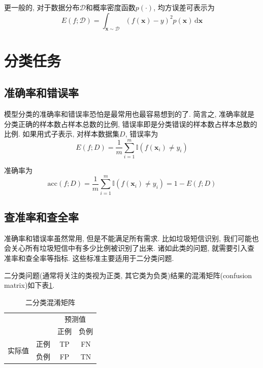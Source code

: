 \documentclass[a4paper,UTF8]{ctexart}
\theoremstyle{plain} \newtheorem{theorem}{定理}[section]
\theoremstyle{plain} \newtheorem{definition}{定义}[section]
\theoremstyle{plain} \newtheorem{lemma}{引理}[section]
\theoremstyle{plain} \newtheorem{proposition}{命题}[section]
\theoremstyle{plain} \newtheorem{example}{例}[section]
\theoremstyle{plain} \newtheorem{remark}{注}[section]
\theoremstyle{plain} \newtheorem{corollary}{推论}[section]
\newcommand\diff{\,{\mathrm d}} %
\begin{document}
更一般的, 对于数据分布$\mathcal{D}$和概率密度函数$p(\cdot)$, 均方误差可表示为
\begin{equation}
E(f; \mathcal{D}) = \int_{\bm{x} \sim \mathcal{D}} (f(\bm{x}) - y)^2 p(\bm{x}) \diff \bm{x}
\end{equation}


\section{分类任务}
\subsection{准确率和错误率}
模型分类的准确率和错误率恐怕是最常用也最容易想到的了. 简言之, 准确率就是分类正确的样本数占样本总数的比例, 错误率即是分类错误的样本数占样本总数的比例. 如果用式子表示, 对样本数据集$D$, 错误率为
\begin{equation}
E(f; D) = \frac{1}{m} \sum_{i=1}^{m} \mathbb{I}(f(\bm{x}_i) \neq y_i)
\end{equation}

准确率为
\begin{equation}
\mathrm{acc}(f; D) = \frac{1}{m} \sum_{i=1}^{m} \mathbb{I}(f(\bm{x}_i) \neq y_i) = 1 - E(f; D)
\end{equation}


\subsection{查准率和查全率}
准确率和错误率虽然常用, 但是不能满足所有需求. 比如垃圾短信识别, 我们可能也会关心所有垃圾短信中有多少比例被识别了出来. 诸如此类的问题, 就需要引入查准率和查全率等指标. 这些标准主要适用于二分类问题.

二分类问题(通常将关注的类视为正类, 其它类为负类)结果的混淆矩阵(confusion matrix)如下表\ref{confuse}.
\begin{table}[!htb]
\centering
\caption{二分类混淆矩阵}
\label{confuse}
\begin{tabular}{ll|c|c|}
\cline{3-4}
   &    & \multicolumn{2}{c|}{预测值} \\ \cline{3-4} 
   &    & 正例          & 负例         \\ \hline
\multicolumn{1}{|l|}{\multirow{2}{*}{实际值}} & 正例 & TP & FN   \\ \cline{2-4} 
\multicolumn{1}{|l|}{}  & 负例 & FP   & TN   \\ \hline
\end{tabular}
\end{table}
\end{document}

